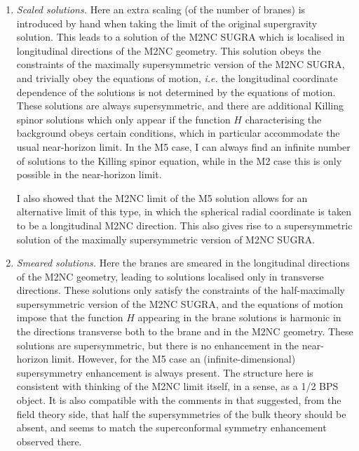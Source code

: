 \documentclass[11pt]{article}
\numberwithin{equation}{section}
\begin{document}
{{\begin{enumerate}
\item \emph{Scaled solutions.}
Here an extra scaling (of the number of branes) is introduced by hand when taking the limit of the original supergravity solution.
This leads to a solution of the M2NC SUGRA which is localised in longitudinal directions of the M2NC geometry.
This solution obeys the constraints of the maximally supersymmetric version of the M2NC SUGRA, and trivially obey the equations of motion, \emph{i.e.} the longitudinal coordinate dependence of the solutions is not determined by the equations of motion. 
These solutions are always supersymmetric, and there are additional Killing spinor solutions which only appear if the function $H$ characterising the background obeys certain conditions, which in particular accommodate the usual near-horizon limit.
In the M5 case, I can always find an infinite number of solutions to the Killing spinor equation, while in the M2 case this is only possible in the near-horizon limit. 

I also showed that the M2NC limit of the M5 solution allows for an alternative limit of this type, in which the spherical radial coordinate is taken to be a longitudinal M2NC direction.
This also gives rise to a supersymmetric solution of the maximally supersymmetric version of M2NC SUGRA.	 	

\item \emph{Smeared solutions.} Here the branes are smeared in the longitudinal directions of the M2NC geometry, leading to solutions localised only in transverse directions.
These solutions only satisfy the constraints of the half-maximally supersymmetric version of the M2NC SUGRA, and the equations of motion impose that the function $H$ appearing in the brane solutions is harmonic in the directions transverse both to the brane and in the M2NC geometry.
These solutions are supersymmetric, but there is no enhancement in the near-horizon limit.
However, for the M5 case an (infinite-dimensional) supersymmetry enhancement is always present.
The structure here is consistent with thinking of the M2NC limit itself, in a sense, as a 1/2 BPS object.
It is also compatible with the comments in \cite{Lambert:2024yjk} that suggested, from the field theory side, that half the supersymmetries of the bulk theory should be absent, and seems to match the  superconformal symmetry enhancement observed there.
\end{enumerate} 


}}
\end{document}
